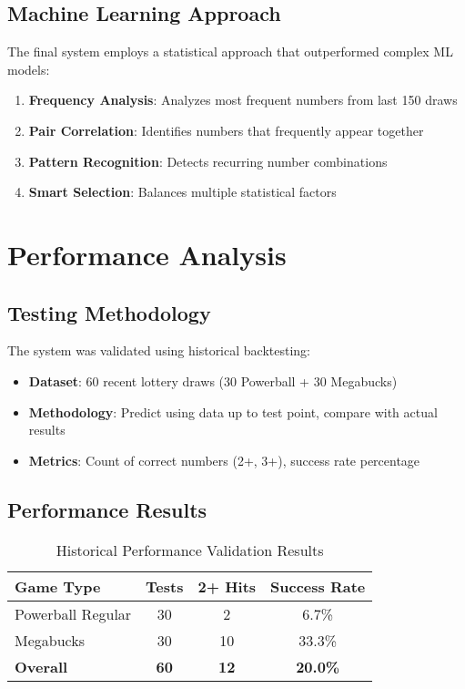 \documentclass[12pt,a4paper]{article}
\begin{document}
\subsection{Machine Learning Approach}
The final system employs a statistical approach that outperformed complex ML models:

\begin{enumerate}
    \item \textbf{Frequency Analysis}: Analyzes most frequent numbers from last 150 draws
    \item \textbf{Pair Correlation}: Identifies numbers that frequently appear together
    \item \textbf{Pattern Recognition}: Detects recurring number combinations
    \item \textbf{Smart Selection}: Balances multiple statistical factors
\end{enumerate}

\section{Performance Analysis}

\subsection{Testing Methodology}
The system was validated using historical backtesting:
\begin{itemize}
    \item \textbf{Dataset}: 60 recent lottery draws (30 Powerball + 30 Megabucks)
    \item \textbf{Methodology}: Predict using data up to test point, compare with actual results
    \item \textbf{Metrics}: Count of correct numbers (2+, 3+), success rate percentage
\end{itemize}

\subsection{Performance Results}

\begin{table}[h]
\centering
\begin{tabular}{@{}lccc@{}}
\toprule
\textbf{Game Type} & \textbf{Tests} & \textbf{2+ Hits} & \textbf{Success Rate} \\
\midrule
Powerball Regular & 30 & 2 & 6.7\% \\
Megabucks & 30 & 10 & 33.3\% \\
\textbf{Overall} & \textbf{60} & \textbf{12} & \textbf{20.0\%} \\
\bottomrule
\end{tabular}
\caption{Historical Performance Validation Results}
\end{table}
\end{document}
